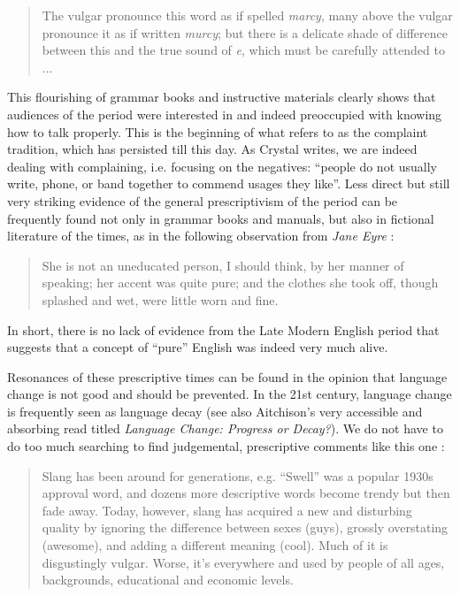 \begin{quote}
    The vulgar pronounce this word as if spelled \textit{marcy}, many above the vulgar pronounce it as if written \textit{murcy}; but there is a delicate shade of difference between this and the true sound of \textit{e}, which must be carefully attended to ... \citep[387]{Walker1823}
\end{quote}

\noindent This flourishing of grammar books and instructive materials clearly shows that audiences of the period were interested in and indeed preoccupied with knowing how to talk properly. This is the beginning of what \citet[249]{Crystal2005} refers to as the complaint tradition, which has persisted till this day. As Crystal writes, we are indeed dealing with complaining, i.e. focusing on the negatives: ``people do not usually write, phone, or band together to commend usages they like''.  Less direct but still very striking evidence of the general prescriptivism of the period can be frequently found not only in grammar books and manuals, but also in fictional literature of the times, as in the following observation from \textit{Jane Eyre} \citep[444]{Bronte2006}:

\begin{quote}
    She is not an uneducated person, I should think, by her manner of speaking; her accent was quite pure; and the clothes she took off, though splashed and wet, were little worn and fine.
\end{quote}

\noindent In short, there is no lack of evidence from the Late Modern English period that suggests that a concept of ``pure'' English was indeed very much alive.

Resonances of these prescriptive times can be found in the opinion that language change is not good and should be prevented. In the 21st century, language change is frequently seen as language decay (see also Aitchison's \citeyear{Aitchison2012} very accessible and absorbing read titled \textit{Language Change: Progress or Decay?}). We do not have to do too much searching to find judgemental, prescriptive comments like this one \citep{York2017}:

\begin{quote}
    Slang has been around for generations, e.g. ``Swell'' was a popular 1930s approval word, and dozens more descriptive words become trendy but then fade away. Today, however, slang has acquired a new and disturbing quality by ignoring the difference between sexes (guys), grossly overstating (awesome), and adding a different meaning (cool). Much of it is disgustingly vulgar. Worse, it's everywhere and used by people of all ages, backgrounds, educational and economic levels.
\end{quote}

